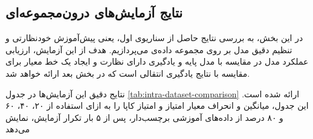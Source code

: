\subsection{نتایج آزمایش‌های درون‌مجموعه‌ای}

در این بخش، به بررسی نتایج حاصل از سناریوی اول، یعنی پیش‌آموزش خودنظارتی و تنظیم دقیق مدل بر روی مجموعه داده‌ی 
می‌پردازیم. هدف از این آزمایش، ارزیابی عملکرد مدل در مقایسه با مدل پایه و یادگیری دارای نظارت و ایجاد یک خط معیار برای مقایسه با نتایج یادگیری انتقالی است که در بخش بعد ارائه خواهد شد.

نتایج دقیق این آزمایش‌ها در جدول
\ref{tab:intra-dataset-comparison}
ارائه شده است. این جدول، میانگین و انحراف معیار امتیاز
و امتیاز کاپا را به ازای استفاده از ۲۰، ۴۰، ۶۰ و ۸۰ درصد از داده‌های آموزشی برچسب‌دار، پس از ۵ بار تکرار آزمایش، نمایش می‌دهد


